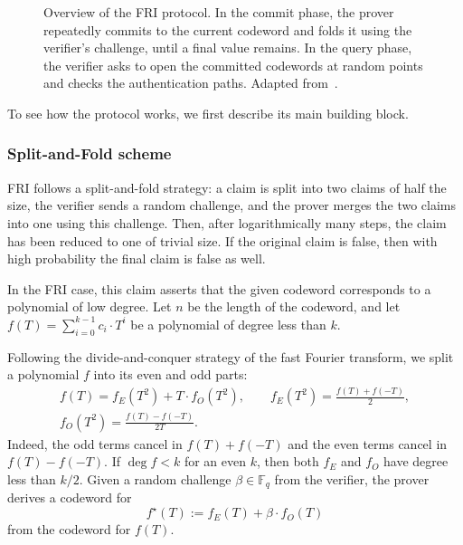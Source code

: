 \documentclass[../../book]{subfiles}
\begin{document}
\begin{figure}[h!]
{
    }
    \caption{Overview of the FRI protocol. In the commit phase, the prover repeatedly commits to the
    current codeword and folds it using the verifier's challenge, until a final value remains.
    In the query phase, the verifier asks to open the committed codewords at random points and checks
    the authentication paths. Adapted from~\cite{szepieniec2021anatomy}.}
    \label{fig:fri-scheme}
\end{figure}

To see how the protocol works, we first describe its main building block.

\subsubsection{Split-and-Fold scheme}
FRI follows a split-and-fold strategy: a claim is split into two claims of half the size, the verifier sends a random challenge, and the prover merges the two claims into one using this challenge. Then, after logarithmically many steps, the claim has been reduced to one of trivial size. If the original claim is false, then with high probability the final claim is false as well.

In the FRI case, this claim asserts that the given codeword corresponds to a polynomial of low degree. Let $n$ be the length of the codeword, and let $f(T)=\sum_{i=0}^{k-1} c_i\cdot T^i$ be a polynomial of degree less than $k$.

Following the divide-and-conquer strategy of the fast Fourier transform, we split a polynomial $f$ into its even and odd parts:
\begin{gather*}
  f(T) = f_E(T^2) + T \cdot f_O(T^2),
  \qquad
  f_E(T^2) = \frac{f(T) + f(-T)}{2},
  \\
  f_O(T^2) = \frac{f(T) - f(-T)}{2T}.
\end{gather*}
Indeed, the odd terms cancel in $f(T) + f(-T)$ and the even terms cancel in $f(T) - f(-T)$.
If $\deg f < k$ for an even $k$, then both $f_E$ and $f_O$ have degree less than $k/2$.
Given a random challenge $\beta \in \mathbb{F}_q$ from the verifier, the prover derives a codeword for
\begin{equation*}
  f^\star(T) := f_E(T) + \beta \cdot f_O(T)
\end{equation*}
from the codeword for $f(T)$.
\end{document}
